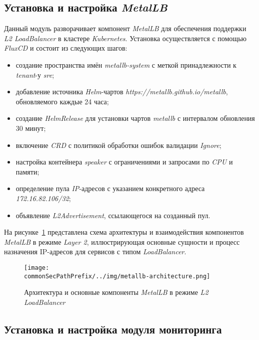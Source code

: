 \subsection{Установка и настройка \textit{MetalLB}}

Данный модуль разворачивает компонент \textit{MetalLB} для обеспечения поддержки \textit{L2 LoadBalancer} в кластере \textit{Kubernetes}. Установка осуществляется с помощью \textit{FluxCD} и состоит из следующих шагов:

\begin{itemize}
    \item создание пространства имён \textit{metallb-system} с меткой принадлежности к \textit{tenant}-у \textit{sre};
    \item добавление источника \textit{Helm}-чартов \textit{https://metallb.github.io/metallb}, обновляемого каждые 24 часа;
    \item создание \textit{HelmRelease} для установки чартов \textit{metallb} с интервалом обновления 30 минут;
    \item включение \textit{CRD} с политикой обработки ошибок валидации \textit{Ignore};
    \item настройка контейнера \textit{speaker} с ограничениями и запросами по \textit{CPU} и памяти;
    \item определение пула \textit{IP}-адресов с указанием конкретного адреса \textit{172.16.82.106/32};
    \item объявление \textit{L2Advertisement}, ссылающегося на созданный пул.
\end{itemize}

На рисунке~\ref{fig:metallb-architecture} представлена схема архитектуры и взаимодействия компонентов \textit{MetalLB} в режиме \textit{Layer 2}, иллюстрирующая основные сущности и процесс назначения IP-адресов для сервисов с типом \textit{LoadBalancer}.

\begin{figure}[ht]
    \centering
    \texttt{[image: \\commonSecPathPrefix/../img/metallb-architecture.png]}
    \caption{Архитектура и основные компоненты \textit{MetalLB} в режиме \textit{L2 LoadBalancer}}
    \label{fig:metallb-architecture}
\end{figure}

\subsection{Установка и настройка модуля мониторинга}

